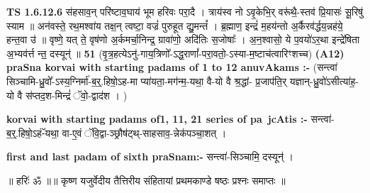 \documentclass[17pt]{extarticle}
\begin{document}
                  \newline
                                \textbf{ TS 1.6.12.6} \newline
                  स॑हसाव॒न् परि॑ष्टाव॒घाय॑ भूम हरिवः परा॒दै । त्राय॑स्व नो ऽवृ॒केभि॒र् वरू॑थै॒-स्तव॑ प्रि॒यासः॑ सू॒रिषु॑ स्याम ॥ अन॑वस्ते॒ रथ॒मश्वा॑य तक्ष॒न् त्वष्टा॒ वज्रं॑ पुरुहूत द्यु॒मन्तं᳚ । ब्र॒ह्माण॒ इन्द्रं॑ म॒हय॑न्तो अ॒र्कैरव॑र्द्धय॒न्नह॑ये॒ हन्त॒वा उ॑ ॥ वृष्णे॒ यत् ते॒ वृष॑णो अ॒र्कमर्चा॒निन्द्र॒ ग्रावा॑णो॒ अदि॑तिः स॒जोषाः᳚ । अ॒न॒श्वासो॒ ये प॒वयो॑ऽर॒था इन्द्रे॑षिता अ॒भ्यव॑र्त्त न्त॒॒ दस्यून्॑ ॥ \textbf{  51} \newline
                  \newline
                      (वृ॒त्र॒हत्येऽनु॑-गाय॒त्रिणो᳚-ऽद्ध॒राणां᳚-परा॒वतो॒-ऽस्या-म॒ष्टाच॑त्वारिꣳशच्च)  \textbf{(A12)} \newline \newline
                \textbf{praSna korvai with starting padams of 1 to 12 anuvAkams :-} \newline
        (सन्त्वा॑ सिञ्चामि-ध्रु॒वो᳚-ऽस्य॒ग्निर्मा॑-ब॒र्॒.हिषो॒ऽह-मा प्या॑यता॒-मग॑न्म॒-यथा॒ वै-यो वै श्र॒द्धां- प्र॒जाप॑ति॒र् यज्ञान्-ध्रु॒वो॑ऽसीत्या॑ह॒-यो वै स॑प्तद॒श-मिन्द्रं॑ ॅवो॒-द्वाद॑श । ) \newline

        \textbf{korvai with starting padams of1, 11, 21 series of pa~jcAtis :-} \newline
        सन्त्वा॑-ब॒र्॒.हिषो॒ऽहं-ॅयथा॒ वा-ए॒वं ॅवि॒द्वा-ञ्छ्रौष॑ट्थ्-साहसाव॒-न्नेक॑पञ्चा॒शत् । \newline

        \textbf{first and last padam of sixth praSnam:-} \newline
        सन्त्वा॑-सिञ्चामि॒ दस्यून्॑ । \newline 

        
        ॥ हरिः॑ ॐ ॥॥ कृष्ण यजुर्वेदीय तैत्तिरीय संहितायां 
प्रथमकाण्डे षष्ठः प्रश्नः समाप्तः ॥ \newline
        \pagebreak
                \pagebreak
        
\end{document}

